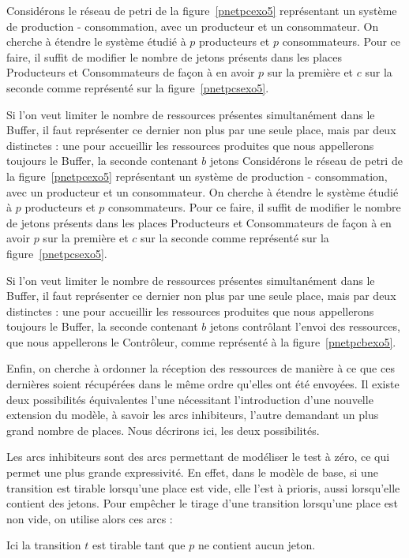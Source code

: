     
Considérons le réseau de petri de la figure~\ref{pnetpcexo5} représentant un système de production -
consommation, avec un producteur et un consommateur. On cherche à étendre le système étudié à $p$
producteurs et $p$ consommateurs. Pour ce faire, il suffit de modifier le nombre de jetons présents
dans les places Producteurs et Consommateurs de façon à en avoir $p$ sur la première et $c$ sur la
seconde comme représenté sur la figure~\ref{pnetpcsexo5}.

Si l'on veut limiter le nombre de ressources présentes simultanément dans le Buffer, il faut
représenter ce dernier non plus par une seule place, mais par deux distinctes : une pour accueillir
les ressources produites que nous appellerons toujours le Buffer, la seconde contenant $b$ jetons
Considérons le réseau de petri de la figure~\ref{pnetpcexo5} représentant un système de production -
consommation, avec un producteur et un consommateur. On cherche à étendre le système étudié à $p$
producteurs et $p$ consommateurs. Pour ce faire, il suffit de modifier le nombre de jetons présents
dans les places Producteurs et Consommateurs de façon à en avoir $p$ sur la première et $c$ sur la
seconde comme représenté sur la figure~\ref{pnetpcsexo5}.

Si l'on veut limiter le nombre de ressources présentes simultanément dans le Buffer, il faut
représenter ce dernier non plus par une seule place, mais par deux distinctes : une pour accueillir
les ressources produites que nous appellerons toujours le Buffer, la seconde contenant $b$ jetons
contrôlant l'envoi des ressources, que nous appellerons le Contrôleur, comme représenté
à la figure~\ref{pnetpcbexo5}.

Enfin, on cherche à ordonner la réception des ressources de manière à ce que ces dernières soient
récupérées dans le même ordre qu'elles ont été envoyées. Il existe deux possibilités équivalentes
l'une nécessitant l'introduction d'une nouvelle extension du modèle, à savoir les arcs inhibiteurs,
l'autre demandant un plus grand nombre de places. Nous décrirons ici, les deux possibilités.

Les arcs inhibiteurs sont des arcs permettant de modéliser le test à zéro, ce qui permet une plus
grande expressivité. En effet, dans le modèle de base, si une transition est tirable lorsqu'une
place est vide, elle l'est à prioris, aussi lorsqu'elle contient des jetons. Pour empêcher le tirage
d'une transition lorsqu'une place est non vide, on utilise alors ces arcs : 
\begin{center}
\end{center}
Ici la transition $t$ est tirable tant que $p$ ne contient aucun jeton.

